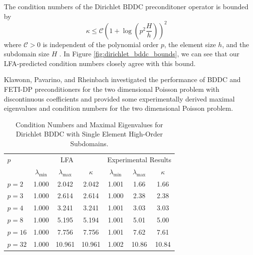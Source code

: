 \documentclass[review]{siamart190516}
\begin{document}
The condition numbers of the Dirichlet BDDC preconditoner operator is bounded by
\begin{equation}
\kappa \leq \mathcal{C} \left( 1 + \log \left( p^2 \frac{H}{h} \right) \right)^2
\end{equation}
where $\mathcal{C} > 0$ is independent of the polynomial order $p$, the element size $h$, and the subdomain size $H$ \cite{klawonn2008spectral}.
In Figure \ref{fig:dirichlet_bddc_bounds}, we can see that our LFA-predicted condition numbers closely agree with this bound.

Klawonn, Pavarino, and Rheinbach investigated the performance of BDDC and FETI-DP preconditioners for the two dimensional Poisson problem with discontinuous coefficients \cite{klawonn2008spectral} and provided some experimentally derived maximal eigenvalues and condition numbers for the two dimensional Poisson problem.

\begin{table}[ht!]
\begin{center}
\begin{tabular}{l ccc ccc}
  \toprule
  $p$  &  \multicolumn{3}{c}{LFA}  &  \multicolumn{3}{c}{Experimental Results}  \\
                      &  $\lambda_{\text{min}}$  &  $\lambda_{\text{max}}$  &  $\kappa$ & $\lambda_{\text{min}}$  &  $\lambda_{\text{max}}$ & $\kappa$  \\
  \toprule
  $p = 2$   &  1.000  &   2.042  &   2.042  &  1.001  &   1.66  &   1.66  \\
  $p = 3$   &  1.000  &   2.614  &   2.614  &  1.000  &   2.38  &   2.38  \\
  $p = 4$   &  1.000  &   3.241  &   3.241  &  1.001  &   3.03  &   3.03  \\
  $p = 8$   &  1.000  &   5.195  &   5.194  &  1.001  &   5.01  &   5.00  \\
  $p = 16$  &  1.000  &   7.756  &   7.756  &  1.001  &   7.62  &   7.61  \\
  $p = 32$  &  1.000  &  10.961  &  10.961  &  1.002  &  10.86  &  10.84  \\
  \bottomrule
\end{tabular}
\end{center}
\caption{Condition Numbers and Maximal Eigenvalues for Dirichlet BDDC with Single Element High-Order Subdomains.}
\label{table:high_order_bddc_experiments_1}
\end{table}
\end{document}
